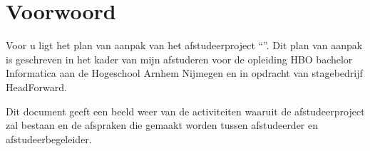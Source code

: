 \chapter{Voorwoord}
Voor u ligt het plan van aanpak van het afstudeerproject ``\thesisTitle''. Dit plan van aanpak is geschreven in het kader van mijn afstuderen voor de opleiding HBO bachelor Informatica aan de Hogeschool Arnhem Nijmegen en in opdracht van stagebedrijf HeadForward.\par
Dit document geeft een beeld weer van de activiteiten waaruit de afstudeerproject zal bestaan en de afspraken die gemaakt worden tussen afstudeerder en afstudeerbegeleider.